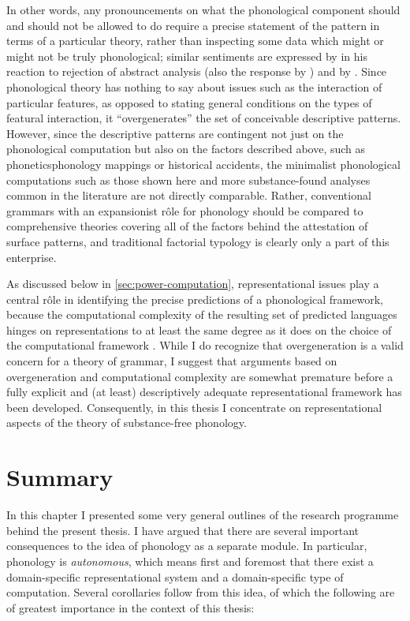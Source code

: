 In other words, any pronouncements on what the phonological component should and should not be allowed to do require a precise statement of the pattern in terms of a particular theory, rather than inspecting some data which might or might not be truly phonological; similar sentiments are expressed by \citet{nevins09} in his reaction to  rejection of abstract analysis (\cf also the response by \citealp{harbour09}) and by \citet{reiss03:_quant,hale-reiss2008}.  Since phonological theory has nothing to say about issues such as the interaction of particular features, as opposed to stating general conditions on the types of featural interaction, it \enquote{overgenerates} the set of conceivable descriptive patterns. However, since the descriptive patterns are contingent not just on the phonological computation but also on the factors described above, such as phonetics\endash phonology mappings or historical accidents, the minimalist phonological computations such as those shown here and more substance\hyp found analyses common in the literature are not directly comparable. Rather, conventional grammars with an expansionist rôle for phonology should be compared to comprehensive theories covering all of the factors behind the attestation of surface patterns, and traditional factorial typology is clearly only a part of this enterprise.

As discussed below in \cref{sec:power-computation}, representational issues play a central rôle in identifying the precise predictions of a phonological framework, because the computational complexity of the resulting set of predicted languages hinges on representations to at least the same degree as it does on the choice of the computational framework \citep{Heinz-2011-CPGLF,heinz11:_tier_stric_local_const_phonol}. While I do recognize that overgeneration is a valid concern for a theory of grammar, I suggest that arguments based on overgeneration and computational complexity are somewhat premature before a fully explicit and (at least) descriptively adequate representational framework has been developed. Consequently, in this thesis I concentrate on representational aspects of the theory of substance\hyp free phonology.

\section{Summary}
\label{sec:summary}

In this chapter I presented some very general outlines of the research programme behind the present thesis. I have argued that there are several important consequences to the idea of phonology as a separate module. In particular, phonology is \emph{autonomous}, which means first and foremost that there exist a domain\hyp specific representational system and a domain\hyp specific type of computation. Several corollaries follow from this idea, of which the following are of greatest importance in the context of this thesis:


